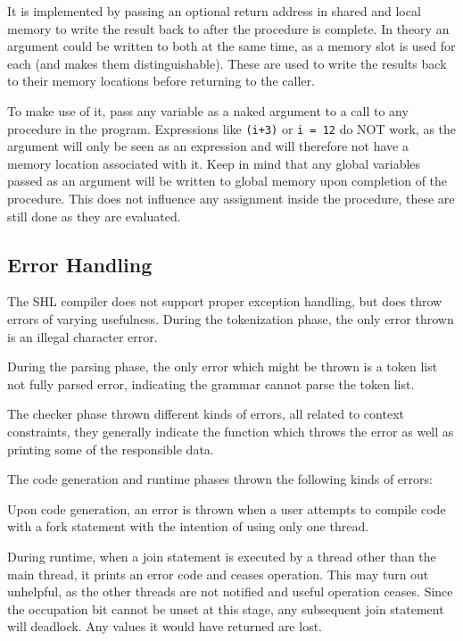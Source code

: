\documentclass[twoside]{report}
\begin{document}
It is implemented by passing an optional return address in shared and local memory to write the result back to after the procedure is complete. In theory an argument could be written to both at the same time, as a memory slot is used for each (and makes them distinguishable). These are used to write the results back to their memory locations before returning to the caller.


To make use of it, pass any variable as a naked argument to a call to any procedure in the program. Expressions like \texttt{(i+3)} or \texttt{i = 12} do NOT work, as the argument will only be seen as an expression and will therefore not have a memory location associated with it. Keep in mind that any global variables passed as an argument will be written to global memory upon completion of the procedure. This does not influence any assignment inside the procedure, these are still done as they are evaluated.


\subsection{Error Handling}
\label{def:error_handling}
The SHL compiler does not support proper exception handling, but does throw errors of varying usefulness. During the tokenization phase, the only error thrown is an illegal character error.

During the parsing phase, the only error which might be thrown is a token list not fully parsed error, indicating the grammar cannot parse the token list.

The checker phase thrown different kinds of errors, all related to context constraints, they generally indicate the function which throws the error as well as printing some of the responsible data.

The code generation and runtime phases thrown the following kinds of errors:

Upon code generation, an error is thrown when a user attempts to compile code with a fork statement with the intention of using only one thread.

During runtime, when a join statement is executed by a thread other than the main thread, it prints an error code and ceases operation. This may turn out unhelpful, as the other threads are not notified and useful operation ceases. Since the occupation bit cannot be unset at this stage, any subsequent join statement will deadlock. Any values it would have returned are lost.

\end{document}
